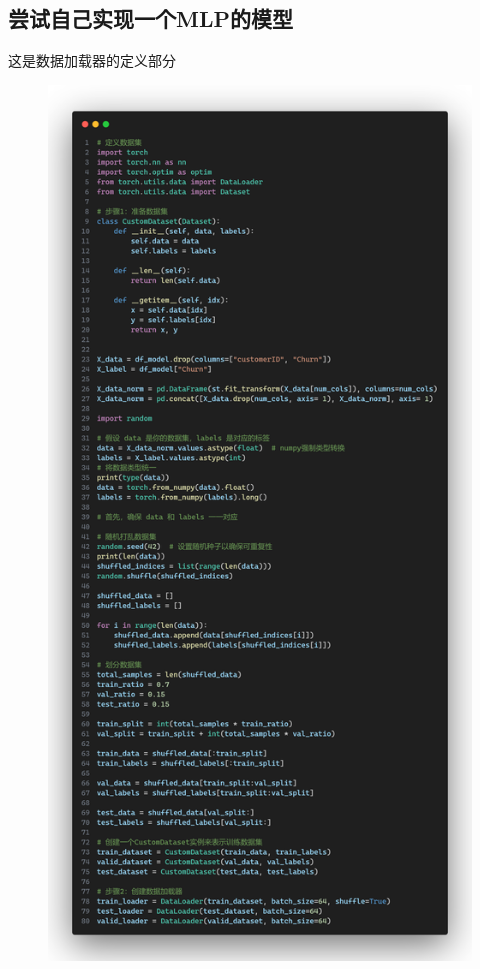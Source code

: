 \documentclass{article}
\begin{document}
\subsection{尝试自己实现一个MLP的模型}
这是数据加载器的定义部分
\begin{figure}[H]
	\centering
	\includegraphics[width=\textwidth]{./img/mlp1.png}
\end{figure}
\end{document}
